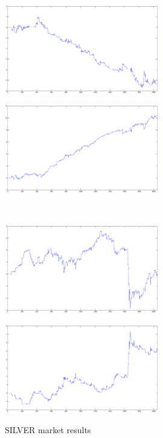 \documentclass{tewiart}
\begin{document}
\begin{figure}[h]
\centering
\begin{minipage}{\linewidth}
\centering
\includegraphics[width=0.6\textwidth]{images/silverA.eps}
\label{jedno}
\end{minipage}
\begin{minipage}{\linewidth}
\centering
\includegraphics[width=0.6\textwidth]{images/silverB.eps}
\label{dwu}
\end{minipage}
\\
\begin{minipage}{\linewidth}
\centering
\includegraphics[width=0.6\textwidth]{images/silverC.eps}
\label{cztero}
\end{minipage}
\begin{minipage}{\linewidth}
\centering
\includegraphics[width=0.6\textwidth]{images/silverD.eps}
\label{mansard}
\end{minipage}
\caption{SILVER market results}
\end{figure}
\end{document}
